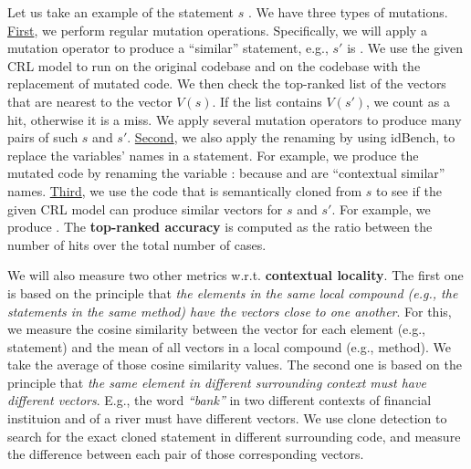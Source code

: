 Let us take an example of the statement $s$ . We have three types of mutations.
\underline{First}, we perform regular mutation
operations. Specifically, we will apply a mutation operator to produce
a ``similar'' statement, e.g., $s'$ is . We use the given CRL model to run on the
original codebase and on the codebase with the replacement of 
mutated code. We then check the top-ranked list of the vectors that
are nearest to the vector $V(s)$. If the list contains $V(s')$, we
count as a hit, otherwise it is a miss. We apply several mutation
operators to produce many pairs of such $s$ and $s'$.
\underline{Second}, we also apply the renaming by using idBench,
to replace the variables' names in a statement. For example, we
produce the mutated code by renaming the variable :  because
 and  are ``contextual similar'' names. \underline{Third},
we use the code that is semantically cloned from $s$ to see if the
given CRL model can produce similar vectors for $s$ and $s'$. For
example, we produce . The {\bf top-ranked accuracy} is computed as the ratio between
the number of hits over the total number of cases.

We will also measure two other metrics w.r.t. {\bf contextual
  locality}. The first one is based on the principle that {\em the
  elements in the same local compound (e.g., the statements in the
  same method) have the vectors close to one another}. For this, we
measure the cosine similarity between the vector for each element
(e.g., statement) and the mean of all vectors in a local compound
(e.g., method). We take the average of those cosine similarity
values. The second one is based on the principle that {\em the same
  element in different surrounding context must have different
  vectors}. E.g., the word {\em ``bank''} in two different contexts of
financial instituion and of a river must have different
vectors. We use clone detection to search for the exact cloned
statement in different surrounding code, and measure the difference
between each pair of those corresponding vectors.


